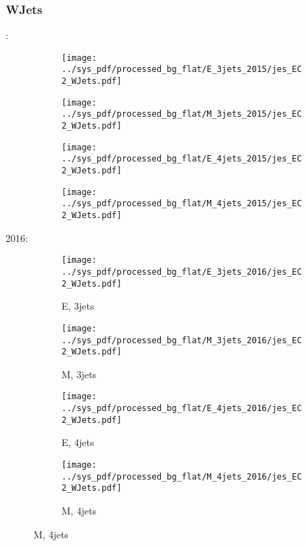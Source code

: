 \documentclass{beamer}
\begin{document}
\begin{frame}
\frametitle{WJets}
\fontsize{5}{1}:
\begin{figure}
\centering
\begin{subfigure}[b]{0.24\textwidth}
\texttt{[image: ../sys\_pdf/processed\_bg\_flat/E\_3jets\_2015/jes\_EC2\_WJets.pdf]}
\end{subfigure}
\begin{subfigure}[b]{0.24\textwidth}
\texttt{[image: ../sys\_pdf/processed\_bg\_flat/M\_3jets\_2015/jes\_EC2\_WJets.pdf]}
\end{subfigure}
\begin{subfigure}[b]{0.24\textwidth}
\texttt{[image: ../sys\_pdf/processed\_bg\_flat/E\_4jets\_2015/jes\_EC2\_WJets.pdf]}
\end{subfigure}
\begin{subfigure}[b]{0.24\textwidth}
\texttt{[image: ../sys\_pdf/processed\_bg\_flat/M\_4jets\_2015/jes\_EC2\_WJets.pdf]}
\end{subfigure}
\end{figure}
2016:
\begin{figure}
\centering
\begin{subfigure}[b]{0.24\textwidth}
\texttt{[image: ../sys\_pdf/processed\_bg\_flat/E\_3jets\_2016/jes\_EC2\_WJets.pdf]}
\captionsetup{font=tiny}
\caption{E, 3jets}
\end{subfigure}
\begin{subfigure}[b]{0.24\textwidth}
\texttt{[image: ../sys\_pdf/processed\_bg\_flat/M\_3jets\_2016/jes\_EC2\_WJets.pdf]}
\captionsetup{font=tiny}
\caption{M, 3jets}
\end{subfigure}
\begin{subfigure}[b]{0.24\textwidth}
\texttt{[image: ../sys\_pdf/processed\_bg\_flat/E\_4jets\_2016/jes\_EC2\_WJets.pdf]}
\captionsetup{font=tiny}
\caption{E, 4jets}
\end{subfigure}
\begin{subfigure}[b]{0.24\textwidth}
\texttt{[image: ../sys\_pdf/processed\_bg\_flat/M\_4jets\_2016/jes\_EC2\_WJets.pdf]}
\captionsetup{font=tiny}
\caption{M, 4jets}
\end{subfigure}
\end{figure}
\end{frame}
\end{document}
